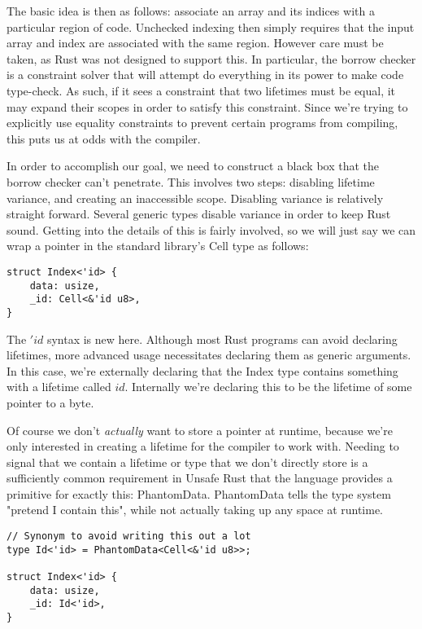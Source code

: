 The basic idea is then as follows: associate an array and its indices with
a particular region of code. Unchecked indexing then simply requires that the
input array and index are associated with the same region.
However care must be taken, as Rust was not designed to support this. In
particular, the borrow checker is a constraint solver that will attempt do
everything in its power to make code type-check. As such, if it sees
a constraint that two lifetimes must be equal, it may expand their scopes in
order to satisfy this constraint. Since we're trying to explicitly use equality
constraints to prevent certain programs from compiling, this puts us at odds
with the compiler.

In order to accomplish our goal, we need to construct a black box that the
borrow checker can't penetrate. This involves two steps: disabling lifetime variance,
and creating an inaccessible scope. Disabling variance is relatively straight
forward. Several generic types disable variance in order to keep Rust sound.
Getting into the details of this is fairly involved, so we will just
say we can wrap a pointer in the standard library's Cell type as follows:

\begin{verbatim}
struct Index<'id> {
    data: usize,
    _id: Cell<&'id u8>,
}
\end{verbatim}

The $'id$ syntax is new here. Although most Rust programs can avoid declaring
lifetimes, more advanced usage necessitates declaring them as generic arguments.
In this case, we're externally declaring that the Index type contains something with
a lifetime called $id$. Internally we're declaring this to be the lifetime of some
pointer to a byte.

Of course we don't \emph{actually} want to store a pointer at runtime, because we're
only interested in creating a lifetime for the compiler to work with. Needing to
signal that we contain a lifetime or type that we don't directly store is a
sufficiently common requirement in Unsafe Rust that the language provides a primitive
for exactly this: PhantomData. PhantomData tells the type system "pretend I
contain this", while not actually taking up any space at runtime.

\begin{verbatim}
// Synonym to avoid writing this out a lot
type Id<'id> = PhantomData<Cell<&'id u8>>;

struct Index<'id> {
    data: usize,
    _id: Id<'id>,
}
\end{verbatim}

